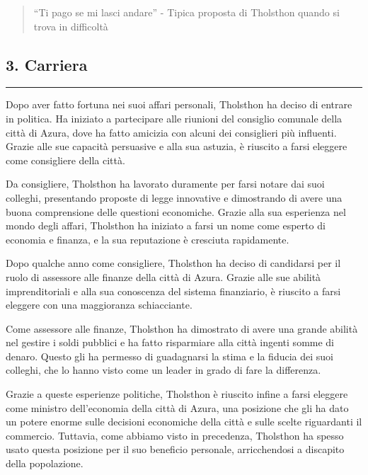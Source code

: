 \begin{quote}
``Ti pago se mi lasci andare'' - Tipica proposta di Tholsthon quando si
trova in difficoltà
\end{quote}

\subsection{3. Carriera}\label{carriera}

\begin{center}\rule{0.5\linewidth}{0.5pt}\end{center}

Dopo aver fatto fortuna nei suoi affari personali, Tholsthon ha deciso
di entrare in politica. Ha iniziato a partecipare alle riunioni del
consiglio comunale della città di Azura, dove ha fatto amicizia con
alcuni dei consiglieri più influenti. Grazie alle sue capacità
persuasive e alla sua astuzia, è riuscito a farsi eleggere come
consigliere della città.

Da consigliere, Tholsthon ha lavorato duramente per farsi notare dai
suoi colleghi, presentando proposte di legge innovative e dimostrando di
avere una buona comprensione delle questioni economiche. Grazie alla sua
esperienza nel mondo degli affari, Tholsthon ha iniziato a farsi un nome
come esperto di economia e finanza, e la sua reputazione è cresciuta
rapidamente.

Dopo qualche anno come consigliere, Tholsthon ha deciso di candidarsi
per il ruolo di assessore alle finanze della città di Azura. Grazie alle
sue abilità imprenditoriali e alla sua conoscenza del sistema
finanziario, è riuscito a farsi eleggere con una maggioranza
schiacciante.

Come assessore alle finanze, Tholsthon ha dimostrato di avere una grande
abilità nel gestire i soldi pubblici e ha fatto risparmiare alla città
ingenti somme di denaro. Questo gli ha permesso di guadagnarsi la stima
e la fiducia dei suoi colleghi, che lo hanno visto come un leader in
grado di fare la differenza.

Grazie a queste esperienze politiche, Tholsthon è riuscito infine a
farsi eleggere come ministro dell'economia della città di Azura, una
posizione che gli ha dato un potere enorme sulle decisioni economiche
della città e sulle scelte riguardanti il commercio. Tuttavia, come
abbiamo visto in precedenza, Tholsthon ha spesso usato questa posizione
per il suo beneficio personale, arricchendosi a discapito della
popolazione.

